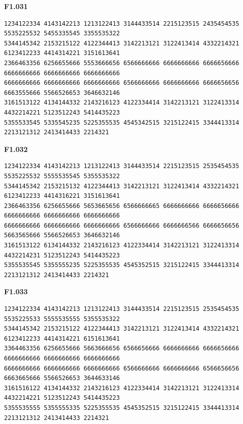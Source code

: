 \noindent\begin{minipage}{\linewidth}\textbf{F1.031}
\begin{lstlisting}
1234122334 4143142213 1213122413 3144433514 2215123515 2435454535 5535225532 5455335545 3355535322
5344145342 2153215122 4122344413 3142213121 3122413414 4332214321 6123412233 4414314221 3151613641
2366463356 6256655666 5553666656 6566666666 6666666666 6666656666 6666666666 6666666666 6666666666
6666666666 6666666666 6666666666 6566666666 6666666666 6666656656 6663555666 5566526653 3646632146
3161513122 4134144332 2143216123 4122334414 3142213121 3122413314 4432214221 5123512243 5414435223
5355533545 5335545235 5225355535 4545342515 3215122415 3344413314 2213121312 2413414433 2214321
\end{lstlisting}
\end{minipage}\par\smallskip

\noindent\begin{minipage}{\linewidth}\textbf{F1.032}
\begin{lstlisting}
1234122334 4143142213 1213122413 3144433514 2215123515 2535454535 5535225532 5555535545 5355535322
5344145342 2153215132 4122344413 3142213121 3122413414 4332214321 6123412233 4414316221 3151613641
2366463356 6256655666 5653665656 6566666665 6666666666 6666656666 6666666666 6666666666 6666666666
6666666666 6666666666 6666666666 6566666666 6666666566 6666656656 5663565666 5566526653 3646632146
3161513122 6134144332 2143216123 4122334414 3142213121 3122413314 4432214231 5123512243 5414435223
5355535545 5355555235 5225355535 4545352515 3215122415 3344413314 2213121312 2413414433 2214321
\end{lstlisting}
\end{minipage}\par\smallskip

\noindent\begin{minipage}{\linewidth}\textbf{F1.033}
\begin{lstlisting}
1234122334 4143142213 1213122413 3144433514 2215123515 2535454535 5535225533 5555535555 5355535322
5344145342 2153215122 4122344413 3142213121 3122413414 4332214321 6123412233 4414314221 6151613641
3364463356 6256655666 5663666656 6566656666 6666666666 6666656666 6666666666 6666666666 6666666666
6666666666 6666666666 6666666666 6566666666 6666666666 6566656656 6663665666 5566526653 3644633146
3161516122 4134144332 2143216123 4122334414 3142213121 3122413314 4432214221 5123512243 5414435223
5355535555 5355555335 5225355535 4545352515 3215122415 3344413314 2213121312 2413414433 2214321
\end{lstlisting}
\end{minipage}\par\smallskip

